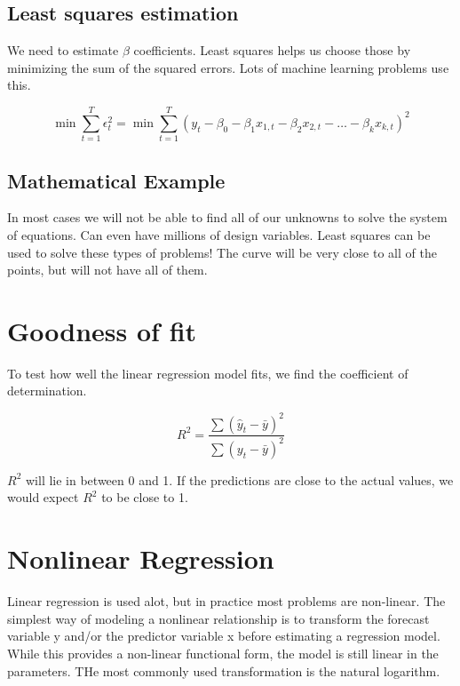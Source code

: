 \documentclass[12pt, a4paper]{report}
\begin{document}
  \subsection{Least squares estimation}

  We need to estimate $ \beta $ coefficients. Least squares helps us choose those by minimizing the sum of the squared errors. Lots of machine learning problems use this.

  \begin{equation}
    \min \sum_{t=1}^T \epsilon_t^2 = \min \sum_{t=1}^T (y_t - \beta_0 - \beta_1 x_{1,t} - \beta_2 x_{2,t} - \ldots - \beta_k  x_{k,t})^2
  \end{equation}

  \subsection{Mathematical Example}

  In most cases we will not be able to find all of our unknowns to solve the system of equations. Can even have millions of design variables. Least squares can be used to solve these types of problems! The curve will be very close to all of the points, but will not have all of them.

  \section{Goodness of fit}

  To test how well the linear regression model fits, we find the coefficient of determination.

  \begin{equation}
    R^2 = \frac{\sum (\hat y_t - \bar y)^2}{\sum(y_t - \bar y)^2}
  \end{equation}

  $ R^2 $ will lie in between 0 and 1. If the predictions are close to the actual values, we would expect $ R^2 $ to be close to 1.

  \section{Nonlinear Regression}

  Linear regression is used alot, but in practice most problems are non-linear. The simplest way of modeling a nonlinear relationship is to transform the forecast variable y and/or the predictor variable x before estimating a regression model. While this provides a non-linear functional form, the model is still linear in the parameters. THe most commonly used transformation is the natural logarithm.
\end{document}
